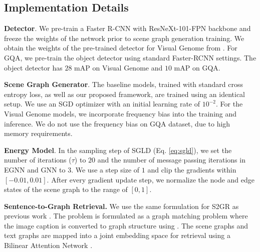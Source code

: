 \documentclass[final]{cvpr}
\begin{document}
\subsection{Implementation Details}
\noindent
\textbf{Detector}. We pre-train a Faster R-CNN \cite{ren2015faster} with ResNeXt-101-FPN \cite{massa2018mrcnn, xie2017aggregated} backbone and freeze the weights of the network prior to scene graph generation training. 
We obtain the weights of the pre-trained detector for Visual Genome from \cite{tang2020sggcode}. For GQA, we pre-train the object detector using standard Faster-RCNN settings. The object detector has $28$ mAP on Visual Genome and $10$ mAP on GQA.

\vspace{0.06in}
\noindent
\textbf{Scene Graph Generator}. 
The baseline models, trained with standard cross entropy loss, as well as our proposed framework, are trained using an identical setup. We use an SGD optimizer with an initial learning rate of $10^{-2}$. For the Visual Genome models, we incorporate frequency bias \cite{zellers2018neural} into the training and inference.  We do not use the frequency bias on GQA dataset, due to  high memory requirements. 

\vspace{0.06in}
\noindent
\textbf{Energy Model}. In the sampling step of SGLD (Eq. \ref{eq:sgld}), we set the number of iterations ($\tau$) to $20$ and the number of message passing iterations in EGNN and GNN to $3$. We use a step size of $1$ and clip the gradients within $[-0.01, 0.01]$. After every gradient update step, we normalize the node and edge states of the scene graph to the range of $[0,1]$.

\vspace{0.06in}
\noindent
\textbf{Sentence-to-Graph Retrieval.} We use the same formulation for S2GR as previous work \cite{tang2020unbiased}. The problem is formulated as a graph matching problem where the image caption is converted to graph structure using \cite{krishna2017visual}. The scene graphs and text graphs are mapped into a joint embedding space for retrieval using a Bilinear Attention Network \cite{kim2018bilinear}. 
\end{document}
